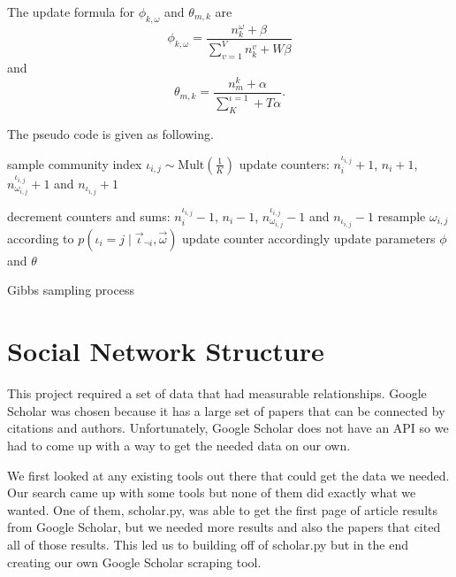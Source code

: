 \documentclass[letterpaper]{article}
\begin{document}
The update formula for $ \phi_{k,\omega} $ and $ \theta_{m,k} $ are
\begin{equation}
\phi_{k,\omega} = \frac{n^{\omega}_{k}+\beta}{\sum_{v=1}^{V}n^{v}_{k}+W\beta}
\end{equation}
and
\begin{equation}
\theta_{m,k} = \frac{n^{k}_{m}+\alpha}{\sum_{K}^{\iota=1}+T\alpha}.
\end{equation}

The pseudo code is given as following.
\begin{algorithm}
	\begin{algorithmic}[1]
		\State sample community index $ \iota_{i,j} \sim \mbox{Mult}(\frac{1}{K}) $
		\State update counters: $ n^{\iota_{i,j}}_{i} + 1 $, $ n_{i} + 1 $, $ n^{\iota_{i,j}}_{\omega_{i,j}} +1 $ and $ n_{\iota_{i,j}} +1 $
		\EndFor
		\EndFor
		
		\State decrement counters and sums:  $ n^{\iota_{i,j}}_{i} - 1 $, $ n_{i} - 1 $, $ n^{\iota_{i,j}}_{\omega_{i,j}} - 1 $ and $ n_{\iota_{i,j}} - 1 $ 
		\State resample $ \omega_{i,j} $ according to  $ p(\iota_{i}=j \mid \vec{\iota}_{\neg i}, \vec{\omega} ) $
		\State update counter accordingly
		\EndFor
		\EndFor
		\State update parameters $ \phi $ and $ \theta $
		\EndIf
		\EndWhile
	\end{algorithmic}
	\caption{Gibbs sampling process}
\end{algorithm}


\section{Social Network Structure}

This project required a set of data that had measurable relationships.
Google Scholar was chosen because it has a large set of papers that can be connected by citations and authors.
Unfortunately, Google Scholar does not have an API so we had to come up with a way to get the needed data on our own.

We first looked at any existing tools out there that could get the data we needed.
Our search came up with some tools but none of them did exactly what we wanted.
One of them, scholar.py, was able to get the first page of article results from Google Scholar, but we needed more results and also the papers that cited all of those results.
This led us to building off of scholar.py but in the end creating our own Google Scholar scraping tool.
\end{document}

